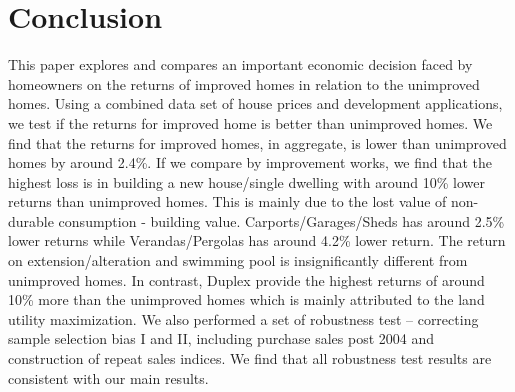 \documentclass[AEJ,reqno, draftmode]{AEA} %
\begin{document}

\restoregeometry

%
%

%
%
%
%
%
%





\section{Conclusion}

This paper explores and compares an important economic decision faced by homeowners on the returns of improved homes in relation to the unimproved homes. Using a combined data set of house prices and development applications, we test if the returns for improved home is better than unimproved homes. We find that the returns for improved homes, in aggregate, is lower than unimproved homes by around 2.4\%. If we compare by improvement works, we find that the highest loss is in building a new house/single dwelling with around 10\% lower returns than unimproved homes. This is mainly due to the lost value of non-durable consumption - building value. Carports/Garages/Sheds has around 2.5\% lower returns while Verandas/Pergolas has around 4.2\% lower return. The return on extension/alteration and swimming pool is insignificantly different from unimproved homes. In contrast, Duplex provide the highest returns of around 10\% more than the unimproved homes which is mainly attributed to the land utility maximization. We also performed a set of robustness test -- correcting sample selection bias I and II, including purchase sales post 2004 and construction of repeat sales indices. We find that all robustness test results are consistent with our main results.
\end{document}
